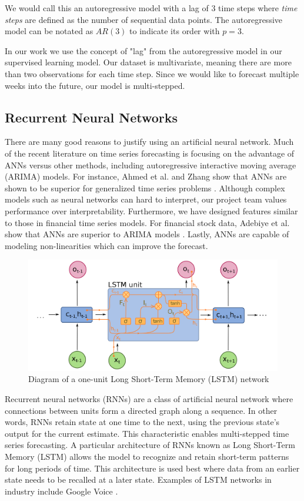 \documentclass[11pt, oneside]{article}
\begin{document}
We would call this an autoregressive model with a lag of 3 time steps where \textit{time steps} are defined as the number of sequential data points. The autoregressive model can be notated as $AR(3)$ to indicate its order with $p=3$.

In our work we use the concept of "lag" from the autoregressive model in our supervised learning model. Our dataset is multivariate, meaning there are more than two observations for each time step. Since we would like to forecast multiple weeks into the future, our model is multi-stepped.

\subsection{Recurrent Neural Networks}

There are many good reasons to justify using an artificial neural network. Much of the recent literature on time series forecasting is focusing on the advantage of ANNs versus other methods, including autoregressive interactive moving average (ARIMA) models. For instance, Ahmed et al. and Zhang show that ANNs are shown to be superior for generalized time series problems \cite{ahmed et al.}. Although complex models such as neural networks can hard to interpret, our project team values performance over interpretability. Furthermore, we have designed features similar to those in financial time series models. For financial stock data, Adebiye et al. show that ANNs are superior to ARIMA models \cite{adebiye et al.}. Lastly, ANNs are capable of modeling non-linearities which can improve the forecast.

\begin{figure}[h]
  \caption{Diagram of a one-unit Long Short-Term Memory (LSTM) network \cite{deloche}}
  \centering
  \includegraphics[width=12.5cm]{images/Long_Short-Term_Memory.png}
\end{figure}

Recurrent neural networks (RNNs) are a class of artificial neural network where connections between units form a directed graph along a sequence. In other words, RNNs retain state at one time to the next, using the previous state's output for the current estimate. This characteristic enables multi-stepped time series forecasting. A particular architecture of RNNs known as Long Short-Term Memory (LSTM) allows the model to recognize and retain short-term patterns for long periods of time. This architecture is used best where data from an earlier state needs to be recalled at a later state. Examples of LSTM networks in industry include Google Voice \cite{beaufays}.
\end{document}
